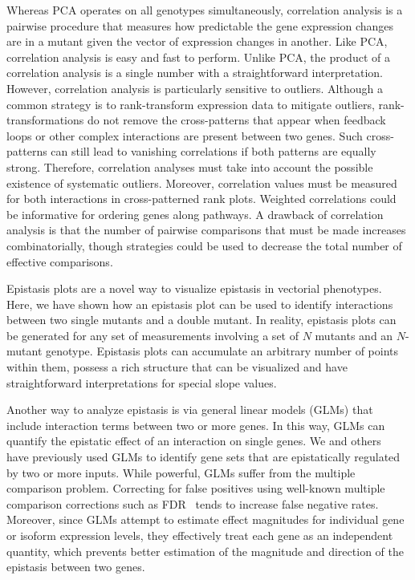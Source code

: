 \documentclass[10pt, onecolumn]{article}
\begin{document}
Whereas PCA operates on all genotypes simultaneously, correlation analysis is a
pairwise procedure that measures how predictable the gene
expression changes are in a mutant given the vector of expression changes in
another. Like PCA, correlation analysis is easy and fast to perform. Unlike PCA,
the product of a correlation analysis is a single number with a straightforward
interpretation. However, correlation analysis is particularly sensitive to outliers.
Although a common strategy is to rank-transform expression data to mitigate
outliers, rank-transformations do not remove the cross-patterns that appear when
feedback loops or other complex interactions are present between two genes.
Such cross-patterns can still lead to vanishing correlations if both patterns are
equally strong. Therefore, correlation analyses must take into account the possible
existence of systematic outliers. Moreover, correlation values must be measured
for both interactions in cross-patterned rank plots. Weighted correlations could
be informative for ordering genes along pathways.
A drawback of correlation
analysis is that the number of pairwise comparisons that must be made increases
combinatorially, though strategies could be used to decrease the total number of
effective comparisons.

Epistasis plots are a novel way to visualize epistasis in vectorial phenotypes.
Here, we have shown how an epistasis plot can be used to identify interactions
between two single mutants and a double mutant. In reality, epistasis plots
can be generated for any set of measurements involving a set of $N$ mutants and
an $N$-mutant genotype. Epistasis plots can accumulate an arbitrary number of
points within them, possess a rich structure that can be visualized and have
straightforward interpretations for special slope values.

Another way to analyze epistasis is via general linear models (GLMs) that include
interaction terms between two or more genes. In this way, GLMs can quantify
the epistatic effect of an interaction on single genes. We and
others~\cite{Dixit2016,Angeles-Albores2016a} have previously used GLMs to identify
gene sets that are epistatically regulated by two or more inputs. While powerful,
GLMs suffer from the multiple comparison problem. Correcting for false positives
using well-known multiple comparison corrections such as FDR~\cite{Storey2003}
tends to increase false negative rates.  Moreover, since GLMs attempt to estimate
effect magnitudes for individual gene or isoform expression levels, they
effectively treat each gene as an independent quantity, which prevents better
estimation of the magnitude and direction of the epistasis between two genes.
\end{document}
